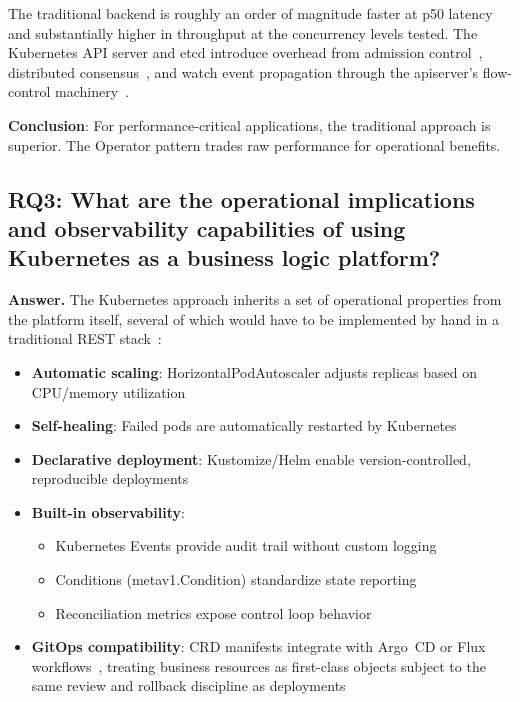 The traditional backend is roughly an order of magnitude faster at p50 latency and substantially higher in throughput at the concurrency levels tested. The Kubernetes API server and etcd introduce overhead from admission control~\cite{crd_features}, distributed consensus~\cite{etcd_impact}, and watch event propagation through the apiserver's flow-control machinery~\cite{k8s_apf}.

\textbf{Conclusion}: For performance-critical applications, the traditional approach is superior. The Operator pattern trades raw performance for operational benefits.

\subsection{RQ3: What are the operational implications and observability capabilities of using Kubernetes as a business logic platform?}

\textbf{Answer.} The Kubernetes approach inherits a set of operational properties from the platform itself, several of which would have to be implemented by hand in a traditional REST stack~\cite{ibryam2020, dobies2020}:

\begin{itemize}
    \item \textbf{Automatic scaling}: HorizontalPodAutoscaler adjusts replicas based on CPU/memory utilization
    \item \textbf{Self-healing}: Failed pods are automatically restarted by Kubernetes
    \item \textbf{Declarative deployment}: Kustomize/Helm enable version-controlled, reproducible deployments
    \item \textbf{Built-in observability}:
    \begin{itemize}
        \item Kubernetes Events provide audit trail without custom logging
        \item Conditions (metav1.Condition) standardize state reporting
        \item Reconciliation metrics expose control loop behavior
    \end{itemize}
    \item \textbf{GitOps compatibility}: CRD manifests integrate with Argo~CD or Flux workflows~\cite{argocd, gitops_principles}, treating business resources as first-class objects subject to the same review and rollback discipline as deployments
\end{itemize}

